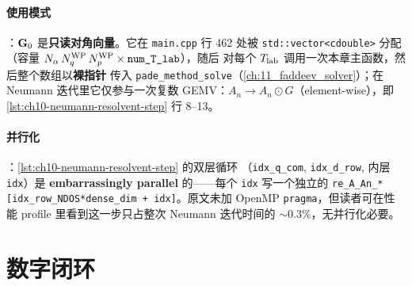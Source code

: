 



\paragraph{使用模式}：\(\mathbf{G}_0\) 是\textbf{只读对角向量}。它在
\texttt{main.cpp} 行 462 处被 \texttt{std::vector<cdouble>}
分配（容量 \(N_\alpha\,{N_{q}^{\text{WP}}}\,{N_{p}^{\text{WP}}} \times \texttt{num\_T\_lab}\)），随后
对每个 \(T_{\rm lab}\) 调用一次本章主函数，然后整个数组以\textbf{裸指针}
传入 \texttt{pade\_method\_solve}（\cref{ch:11_faddeev_solver}）；在 Neumann
迭代里它仅参与一次复数 GEMV：\(A_n \to A_n \odot G\)（element-wise），即
\cref{lst:ch10-neumann-resolvent-step} 行 8--13。

\paragraph{并行化}：\cref{lst:ch10-neumann-resolvent-step} 的双层循环
（\texttt{idx\_q\_com}, \texttt{idx\_d\_row}, 内层 \texttt{idx}）是
\textbf{embarrassingly parallel} 的——每个 \texttt{idx} 写一个独立的
\texttt{re\_A\_An\_*[idx\_row\_NDOS*dense\_dim + idx]}。原文未加 OpenMP
\texttt{pragma}，但读者可在性能 profile 里看到这一步只占整次 Neumann
迭代时间的 \(\sim 0.3\%\)，无并行化必要。

\section{数字闭环}
\label{sec:ch10-numerical}

